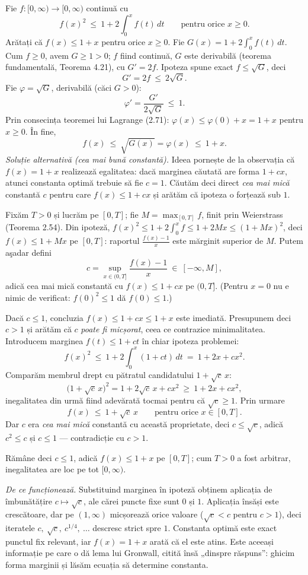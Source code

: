 Fie $f:[0,\infty)\to[0,\infty)$ continuă cu
\[ f(x)^2\ \le\ 1+2\int_0^xf(t)\,dt\qquad\text{pentru orice }x\ge0 . \]
Arătați că $f(x)\le1+x$ pentru orice $x\ge0$.
\sol Fie $G(x)=1+2\displaystyle\int_0^xf(t)\,dt$. Cum $f\ge0$, avem $G\ge1>0$; $f$ fiind continuă, $G$ este derivabilă (teorema fundamentală, Teorema 4.21), cu $G'=2f$. Ipoteza spune exact $f\le\sqrt G$, deci
\[ G'=2f\ \le\ 2\sqrt G . \]
Fie $\varphi=\sqrt G$, derivabilă (căci $G>0$):
\[ \varphi'=\frac{G'}{2\sqrt G}\ \le\ 1 . \]
Prin consecința teoremei lui Lagrange (2.71): $\varphi(x)\le\varphi(0)+x=1+x$ pentru $x\ge0$. În fine,
\[ f(x)\ \le\ \sqrt{G(x)}=\varphi(x)\ \le\ 1+x . \]
\emph{Soluție alternativă (cea mai bună constantă).} Ideea pornește de la observația
că $f(x)=1+x$ realizează egalitatea: dacă marginea căutată are forma $1+cx$, atunci
constanta optimă trebuie să fie $c=1$. Căutăm deci direct \emph{cea mai mică}
constantă $c$ pentru care $f(x)\le1+cx$ și arătăm că ipoteza o forțează sub $1$.

Fixăm $T>0$ și lucrăm pe $[0,T]$; fie $M=\max_{[0,T]}f$, finit prin Weierstrass
(Teorema 2.54). Din ipoteză, $f(x)^2\le1+2\int_0^xf\le1+2Mx\le(1+Mx)^2$, deci
$f(x)\le1+Mx$ pe $[0,T]$: raportul $\frac{f(x)-1}{x}$ este mărginit superior de $M$.
Putem aşadar defini
\[ c=\sup_{x\in(0,T]}\frac{f(x)-1}{x}\ \in\ [-\infty,M], \]
adică cea mai mică constantă cu $f(x)\le1+cx$ pe $(0,T]$. (Pentru $x=0$ nu e nimic
de verificat: $f(0)^2\le1$ dă $f(0)\le1$.)

Dacă $c\le1$, concluzia $f(x)\le1+cx\le1+x$ este imediată. Presupunem deci $c>1$ și
arătăm că $c$ \emph{poate fi micșorat}, ceea ce contrazice minimalitatea. Introducem
marginea $f(t)\le1+ct$ în chiar ipoteza problemei:
\[ f(x)^2\ \le\ 1+2\int_0^x(1+ct)\,dt\ =\ 1+2x+cx^2 . \]
Comparăm membrul drept cu pătratul candidatului $1+\sqrt c\,x$:
\[ \bigl(1+\sqrt c\,x\bigr)^2=1+2\sqrt c\,x+cx^2\ \ge\ 1+2x+cx^2 , \]
inegalitatea din urmă fiind adevărată tocmai pentru că $\sqrt c\ge1$. Prin urmare
\[ f(x)\ \le\ 1+\sqrt c\,x\qquad\text{pentru orice }x\in[0,T]. \]
Dar $c$ era \emph{cea mai mică} constantă cu această proprietate, deci $c\le\sqrt c$, adică\
$c^2\le c$ și $c\le1$ --- contradicție cu $c>1$.

Rămâne deci $c\le1$, adică $f(x)\le1+x$ pe $[0,T]$; cum $T>0$ a fost arbitrar,
inegalitatea are loc pe tot $[0,\infty)$.

\noindent\emph{De ce funcționează.} Substituind marginea în ipoteză obținem
aplicația de îmbunătățire $c\mapsto\sqrt c$, ale cărei puncte fixe sunt $0$ și $1$.
Aplicația însăși este crescătoare, dar pe $(1,\infty)$ micșorează orice valoare
($\sqrt c<c$ pentru $c>1$), deci iteratele $c,\ \sqrt c,\ c^{1/4},\ \dots$ descresc strict
spre $1$. Constanta optimă este exact
punctul fix relevant, iar $f(x)=1+x$ arată că el este atins. Este aceeași
informație pe care o dă lema lui Gronwall, citită însă „dinspre răspuns'': ghicim
forma marginii și lăsăm ecuația să determine constanta.


